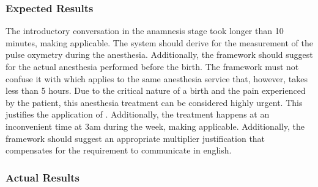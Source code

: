 \subsubsection{Expected Results}
The introductory conversation in the anamnesis stage took longer than 10 minutes, making  applicable.
The system should derive  for the measurement of the pulse oxymetry during the anesthesia.
Additionally, the framework should suggest
for the actual anesthesia performed before the birth.
The framework must not confuse it with  which applies to the same anesthesia service that, however, takes less than 5 hours.
Due to the critical nature of a birth and the pain experienced by the patient, this anesthesia treatment can be considered highly urgent.
This justifies the application of .
Additionally, the treatment happens at an inconvenient time at 3am during the week,
making  applicable.
Additionally, the framework should suggest an appropriate multiplier justification that compensates for the requirement to communicate in english.

\subsubsection{Actual Results}

%



